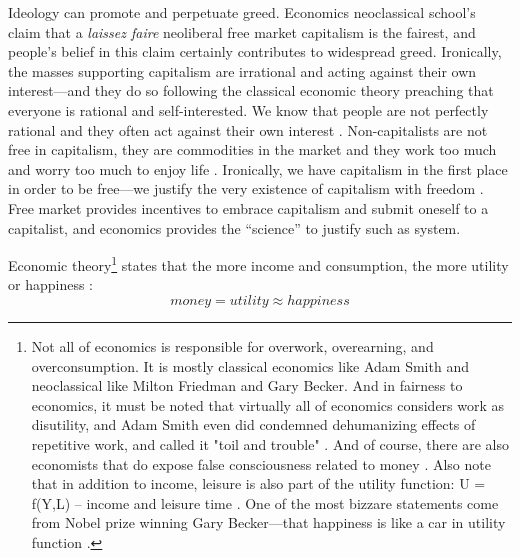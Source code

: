 \documentclass[10pt, letterpaper]{article}
\begin{document}
\begin{spacing}{1.8}

Ideology can promote and perpetuate greed. Economics neoclassical school's claim that a \textit{laissez faire} neoliberal free market capitalism is the fairest, and people's belief
in this claim certainly contributes to widespread greed. Ironically, the masses supporting capitalism are irrational and acting against
their own interest---and they do so following the classical economic theory preaching that everyone is rational and self-interested. 
We know that people are not perfectly rational and they often act against their own
interest \citep{akerlof10,ariely09,shiller15}. Non-capitalists are not
free in capitalism, they are commodities in the market and they work too much and worry too much to enjoy life \citep{aokJap14}. Ironically, we
have capitalism in the first place in order to be free---we justify the very
existence of capitalism with freedom \citep{hayek14,friedman09,glaeser11B}. Free
market provides incentives to embrace capitalism and submit oneself to a capitalist, and economics provides the ``science'' to justify such as system.


Economic theory\footnote{Not all of economics is responsible for overwork, overearning, and
overconsumption. It is mostly classical economics like Adam Smith and neoclassical like
Milton Friedman and Gary Becker. And in fairness to  economics, it must
be noted that  virtually all of economics considers work as disutility, and Adam
Smith  even did  condemned dehumanizing effects of repetitive work, and called
it "toil and trouble" \citep[][p. 54]{spencer20}.  
And of course, there are also economists that do
expose false consciousness related to money \citep[e.g,][]{kahneman06c}. %
 Also note that in addition to income, leisure is also part of the utility
 function: U = f(Y,L) -- income and leisure time
 \citep{mcconnell2016contemporary}. One of the most bizzare statements come from
 Nobel prize winning Gary Becker---that happiness is like a car in utility function \citep{becker08}.
} states that the more income and consumption, the
more utility or happiness \citep{autor10,becker08}: 
\begin{equation}
money 
  = utility \approx happiness
\end{equation}


\end{spacing}
\end{document}
